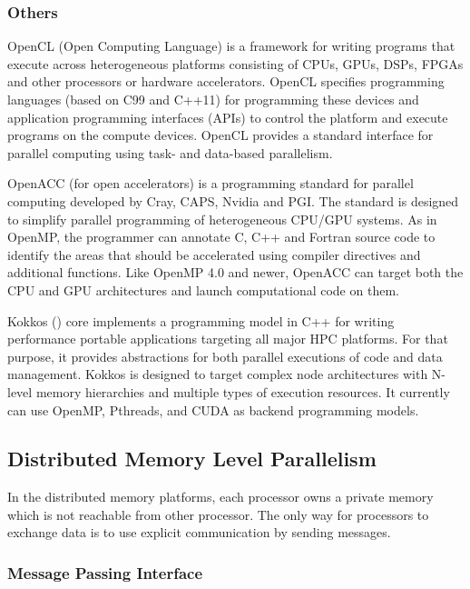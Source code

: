 \subsubsection{Others}

OpenCL (Open Computing Language) is a framework for writing programs that execute across heterogeneous platforms consisting of CPUs, GPUs, DSPs, FPGAs and other processors or hardware accelerators. OpenCL specifies programming languages (based on C99 and C++11) for programming these devices and application programming interfaces (APIs) to control the platform and execute programs on the compute devices. OpenCL provides a standard interface for parallel computing using task- and data-based parallelism.

OpenACC (for open accelerators) is a programming standard for parallel computing developed by Cray, CAPS, Nvidia and PGI. The standard is designed to simplify parallel programming of heterogeneous CPU/GPU systems. As in OpenMP, the programmer can annotate C, C++ and Fortran source code to identify the areas that should be accelerated using compiler directives and additional functions. Like OpenMP 4.0 and newer, OpenACC can target both the CPU and GPU architectures and launch computational code on them.

Kokkos (\cite{edwards2014kokkos}) core implements a programming model in C++ for writing performance portable applications targeting all major HPC platforms. For that purpose, it provides abstractions for both parallel executions of code and data management. Kokkos is designed to target complex node architectures with N-level memory hierarchies and multiple types of execution resources. It currently can use OpenMP, Pthreads, and CUDA as backend programming models.


\subsection{Distributed Memory Level Parallelism}

In the distributed memory platforms, each processor owns a private memory which is not reachable from other processor. The only way for processors to exchange data is to use explicit communication by sending messages. 

\subsubsection{Message Passing Interface}

